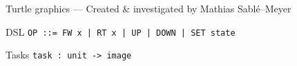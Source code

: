 \documentclass{beamer}
\begin{document}



  



\begin{frame}{Turtle graphics --- \small{Created \& investigated by Mathias
  Sablé--Meyer}}

  \begin{block}{DSL}
    \texttt{OP ::= FW x | RT x | UP | DOWN | SET state}
  \end{block}

  \begin{block}{Tasks}
    \texttt{task : unit -> image}
  \end{block}

  \vspace{0.2cm}


\end{frame}
\end{document}
